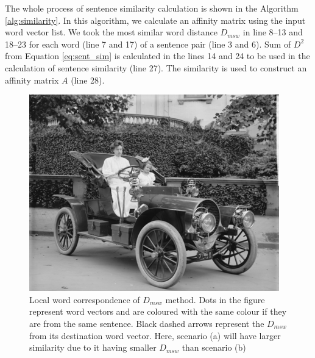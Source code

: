 \documentclass[acmlarge]{acmart}
\begin{document}
The whole process of sentence similarity calculation is shown in the Algorithm \ref{alg:similarity}. In this algorithm, we calculate an affinity matrix using the input word vector list. We took the most similar word distance $D_{msw}$ in line 8--13 and 18--23 for each word (line 7 and 17) of a sentence pair (line 3 and 6). Sum of $D^2$ from Equation \ref{eq:sent_sim} is calculated in the lines 14 and 24 to be used in the calculation of sentence similarity (line 27). The similarity is used to construct an affinity matrix $A$ (line 28).
\begin{figure}
	\centering
	
	\includegraphics{sample-franklin}
	\caption{Local word correspondence of $D_{msw}$ method. Dots in the figure represent word vectors and are coloured with the same colour if they are from the same sentence. Black dashed arrows represent the $D_{msw}$ from its destination word vector. Here, scenario (a) will have larger similarity due to it having smaller $D_{msw}$ than scenario (b)}
	\label{fig:msd}
\end{figure}
\end{document}
